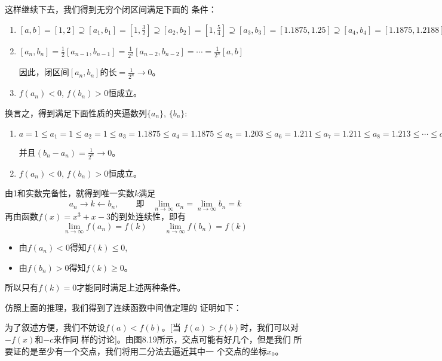 这样继续下去，我们得到无穷个闭区间满足下面的
条件：
\begin{enumerate}
    \item $[a,b]=[1,2]\supseteq [a_1,b_1]=\left[1,\frac{3}{2}\right]\supseteq [a_2,b_2]=\left[1,\frac{5}{4}\right]\supseteq [a_3,b_3]=\left[1.1875,1.25\right]
    \supseteq [a_4,b_4]=\left[1.1875,1.2188\right]\supseteq [a_5,b_5]=\left[1.203,1.2188\right]\supseteq [a_6,b_6]=\left[1.211,1.2188\right]\supseteq [a_7,b_7]=\left[1.211,1.215\right]\supseteq [a_8,b_8]=\left[1.213,1.215\right]\supseteq   \cdots 
    \supseteq  
    [a_n,b_n]=\supseteq\cdots $
    \item $[a_n,b_n]=\frac{1}{2}[a_{n-1},b_{n-1}]=\frac{1}{2^2}[a_{n-2},b_{n-2}]=\cdots=\frac{1}{2^n}[a,b]$
    
    因此，闭区间$[a_n,b_n]$的长$=\frac{1}{2^n}\to 0$。
    \item $f(a_n)<0$,\; $f(b_n)>0$恒成立。
\end{enumerate}

换言之，得到满足下面性质的夹逼数列$\{a_n\}$, $\{b_n\}$:
\begin{enumerate}
    \item $a=1\le a_1=1\le a_2=1\le a_3=1.1875\le a_4=1.1875  \le  a_5=1.203  \le  a_6=1.211  \le  a_7=1.211  \le  a_8=1.213  \le\cdots\le a_n\le\cdots\le b_n\le \cdots \le  b_8=1.215  \le  b_7=1.215  \le  b_6=1.2188  \le  b_5=1.2188   \le  b_4= 1.2188  \le  b_3= 1.25 \le  b_2=1.25  \le  b_1=1.5  \le  b=2$
    
    并且$(b_n-a_n)=\frac{1}{2^n}\to 0$。

\item $f(a_n)<0$,\; $f(b_n)>0$恒成立。
\end{enumerate}

由1和实数完备性，就得到唯一实数$k$满足
\[a_n\to k\leftarrow b_n,\qquad \text{即}\quad \lim_{n\to\infty} a_n=\lim_{n\to\infty}  b_n=k\]
再由函数$f(x)=x^3+x-3$的到处连续性，即有
\[\lim_{n\to\infty}  f(a_n)=f(k) \qquad  \lim_{n\to\infty}  f(b_n)=f(k)\]
\begin{itemize}
    \item 由$f(a_n)<0$得知$f(k)\le 0$,
    \item 由$f(b_n)>0$得知$f(k)\ge 0$。
\end{itemize}
所以只有$f(k)=0$才能同时满足上述两种条件。

仿照上面的推理，我们得到了连续函数中间值定理的
证明如下：

为了叙述方便，我们不妨设$f(a)<f(b)$。[当
$f(a)>f(b)$时，我们可以对$-f(x)$和$-c$来作同
样的讨论]。由图8.19所示，交点可能有好几个，但是我们
所要证的是至少有一个交点，我们将用二分法去逼近其中一
个交点的坐标$x_0$。

